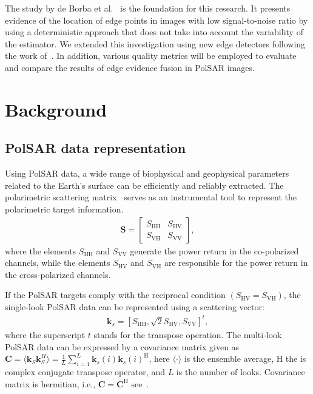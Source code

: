 \documentclass{article}
\begin{document}
The study by de Borba et al.~\cite{DeBorba2020} is the foundation for this research. It presents evidence of the location of edge points in images with low signal-to-noise ratio by using a deterministic approach that does not take into account the variability of the estimator. We extended this investigation using new edge detectors following the work of~\cite{Xiang2016, Nascimento2014,Shi2020}. In addition, various quality metrics will be employed to evaluate and compare the results of edge evidence fusion in PolSAR images.
\section{Background}
\subsection{PolSAR data representation }
Using PolSAR data, a wide range of biophysical and geophysical parameters related to the Earth's surface can be efficiently and reliably extracted. The polarimetric scattering matrix~\cite{Lee2017} serves as an instrumental tool to represent the polarimetric target information.
\begin{align}
 \mathbf{S} = \begin{bmatrix}
S_{\text{HH}} & S_{\text{HV}} \\
S_{\text{VH}} & S_{\text{VV}}
\end{bmatrix},  
\label{E:a1}
\end{align}
where the elements $S_{\text{HH}}$ and $S_{\text{VV}}$ generate the power return in the co-polarized channels, while the elements $S_{\text{HV}}$ and $S_{\text{VH}}$ are responsible for the power return in the cross-polarized channels.\par
If the PolSAR targets comply with the reciprocal condition $(S_{\text{HV}} = S_{\text{VH}})$, the single-look PolSAR data can be represented using a scattering vector:
\begin{align}
\mathbf{k}_s=[S_{\text{HH}}, \sqrt{2}S_{\text{HV}}, S_{\text{VV}} ]^t,
\label{E:21}
\end{align}
where  the superscript $t$ stands for the transpose operation. The multi‑look PolSAR data can be expressed  by a covariance matrix  given as 
\(\mathbf{C}=\langle\mathbf{k}_S\mathbf{k}_S^H \rangle= \frac{1}{L} \sum_{i=1}^{L} \mathbf{k}_s(i)\mathbf{k}_s(i)^\text{H} \), here $\langle \cdot \rangle$ is the ensemble average, H  the is complex conjugate transpose operator, and $L$ is the number of looks. Covariance matrix is hermitian, i.e., $\mathbf{C}= \mathbf{C}^\text{H}$
see~\cite{Qin2022}.
\end{document}
